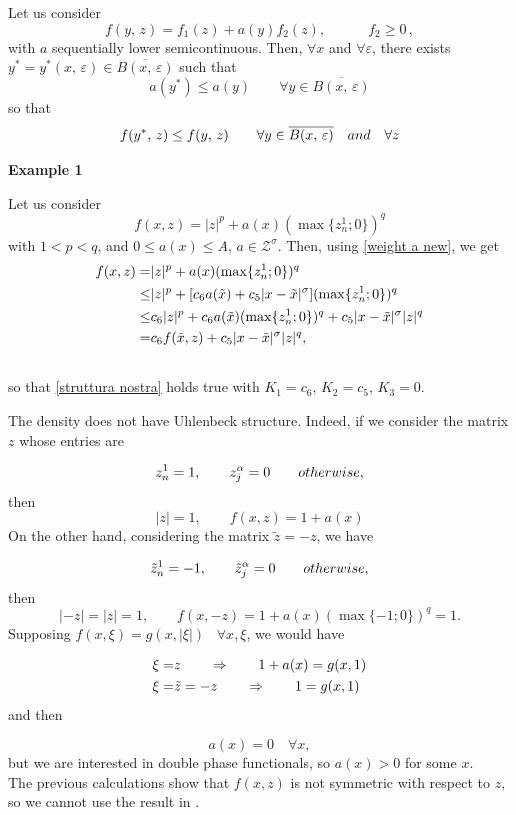 \documentclass[a4paper,10pt]{article}
\theoremstyle{plain}
\theoremstyle{definition}
\numberwithin{equation}{section} \makeatletter
\begin{document}
 
 
 Let us consider 
 $$
 f(y,\, z)=f_1(z)+a(y)f_2( z), \qquad\quad f_2\ge 0\,,
 $$  with $a$  sequentially lower semicontinuous. 
 Then, 
   $\forall x$ and $\forall\varepsilon$,  there exists $y^*=y^*(x,\,\varepsilon)\in \overline{B(x,\,\varepsilon)} $ such that 
 $$a(y^*)\le a(y)
  \qquad \forall y\in \overline{B(x,\,\varepsilon)}
  $$
  so that
  $$
f(y^*,\, z)\le f(y,\,z)
\qquad \forall y\in \overline{B(x,\,\varepsilon)}
\quad { \rm and } 
\quad \forall z
$$
 
\vspace{0.3 cm}

\noindent
{\bf Example 1}


\noindent
Let us consider
\[
f(x,z)=|z|^p+a(x)(\max\{z_n^1; 0\})^q
\]
with $1 < p< q$, and $0\le a(x) \le A $, $a \in \mathcal{Z}^\sigma$. Then, using \eqref{weight a new}, we get
\begin{align*}
   f(x,z)= &|z|^p+a(x)(\max\{z_n^1; 0\})^q  \\ \notag
  \le &|z|^p+ [c_6 a(\tilde{x})+ c_5 |x-\tilde{x}|^\sigma] (\max\{z_n^1; 0\})^q  \\ \notag
  \le & c_6|z|^p+ c_6 a(\tilde{x}) (\max\{z_n^1; 0\})^q + c_5 |x-\tilde{x}|^\sigma |z|^q  \\ \notag
  = & c_6 f(\tilde{x}, z)+  c_5 |x-\tilde{x}|^\sigma |z|^q,  \\ \notag
\end{align*} 
so that \eqref{struttura nostra} holds true with $K_1 = c_6$, $K_2 = c_5$, $K_3 = 0$.


\noindent The density does not have  Uhlenbeck structure.
Indeed, if we consider the matrix $z$ whose entries are

\[
z_n^1=1,   \qquad z_j^{\alpha}=0 \qquad {\rm otherwise,}
\]
then
\[
|z|=1, \qquad f(x,z)= 1+a(x)
\]
On the other hand, considering the matrix $\tilde{z}=-z$, we have

\[
\tilde{z}_n^1=-1,  \qquad \tilde{z}_j^{\alpha}=0   \qquad {\rm otherwise,}
\]
then
\[
|-z|=|z|=1, \qquad f(x,-z)= 1+a(x)(\max\{-1; 0\})^q=1.
\]
Supposing $f(x,\xi)=g(x, |\xi|)$ \, $\forall x, \xi$, we would have

\begin{align*}
\xi=& z \qquad \Rightarrow \qquad 1+a(x)=g(x,1)\notag\\
\xi= &\tilde{z}=-z \qquad \Rightarrow \qquad 1=g(x,1)
\end{align*}
and then

$$a(x)=0 \quad \forall x,$$
but we are interested in  double phase functionals, so $a(x)>0$ for some $x$.\\
\noindent The previous calculations show that $f(x,z)$ is not symmetric with respect to $z$, so we cannot use the result in \cite{BC}.
\end{document}
